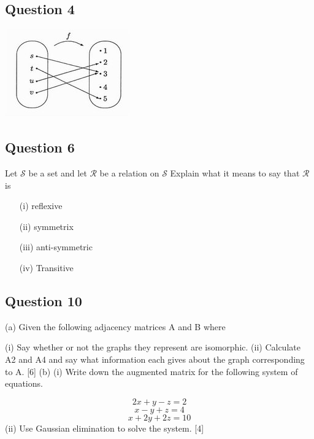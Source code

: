 \documentclass[]{report}
\begin{document}
\subsection*{Question 4}
\begin{center}
\includegraphics[scale=0.55]{HibCollArrow.jpg}
\end{center}

\subsection*{Question 6}
Let $\mathcal{S}$ be a set and let $\mathcal{R}$ be a relation on $\mathcal{S}$
Explain what it means to say that $\mathcal{R}$ is

\begin{itemize}
\item[(i)] reflexive
\item[(ii)] symmetrix
\item[(iii)] anti-symmetric
\item[(iv)] Transitive
\end{itemize}


\subsection*{Question 10}

(a) Given the following adjacency matrices A and B where
%
%
%



(i) Say whether or not the graphs they represent are isomorphic.
(ii) Calculate A2 and A4 and say what information each gives about the graph
corresponding to A. [6]
(b) (i) Write down the augmented matrix for the following system of equations.

\[2x + y - z = 2\]
\[x - y + z = 4\]
\[x + 2y + 2z = 10\]
(ii) Use Gaussian elimination to solve the system. [4]
\end{document}
